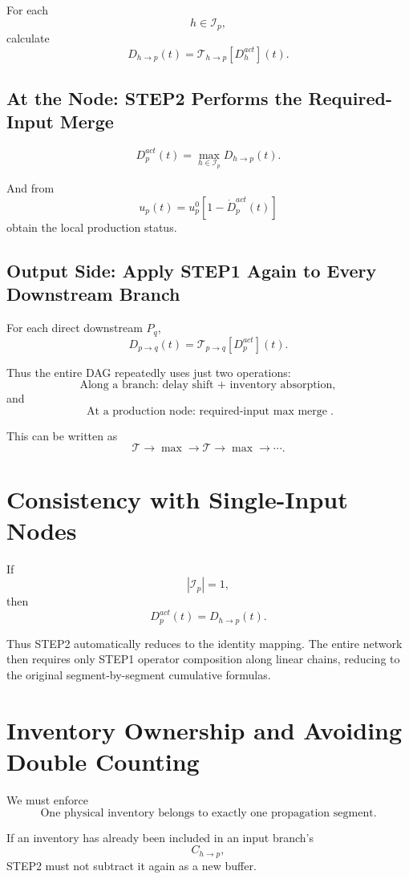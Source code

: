 \documentclass[11pt]{article}
\begin{document}
For each
\[
h\in\mathcal I_p,
\]
calculate
\[
\boxed{
D_{h\to p}(t)
=
\mathcal T_{h\to p}[D_h^{act}](t).
}
\tag{29}
\]

\subsection*{At the Node: STEP2 Performs the Required-Input Merge}

\[
\boxed{
D_p^{act}(t)
=
\max_{h\in\mathcal I_p}
D_{h\to p}(t).
}
\tag{30}
\]

And from
\[
\boxed{
u_p(t)
=
u_p^0
[1-\dot D_p^{act}(t)]
}
\tag{31}
\]
obtain the local production status.

\subsection*{Output Side: Apply STEP1 Again to Every Downstream Branch}

For each direct downstream \(P_q\),
\[
\boxed{
D_{p\to q}(t)
=
\mathcal T_{p\to q}[D_p^{act}](t).
}
\tag{32}
\]

Thus the entire DAG repeatedly uses just two operations:
\[
\boxed{
\text{Along a branch: delay shift + inventory absorption},
}
\]
and
\[
\boxed{
\text{At a production node: required-input \(\max\) merge}.
}
\]

This can be written as
\[
\boxed{
\mathcal T
\rightarrow
\max
\rightarrow
\mathcal T
\rightarrow
\max
\rightarrow\cdots.
}
\tag{33}
\]

\section{Consistency with Single-Input Nodes}

If
\[
|\mathcal I_p|=1,
\]
then
\[
\boxed{
D_p^{act}(t)
=
D_{h\to p}(t).
}
\tag{34}
\]

Thus STEP2 automatically reduces to the identity mapping.
The entire network then requires only STEP1 operator composition along linear chains,
reducing to the original segment-by-segment cumulative formulas.

\section{Inventory Ownership and Avoiding Double Counting}

We must enforce
\[
\boxed{
\text{One physical inventory belongs to exactly one propagation segment}.
}
\]

If an inventory has already been included in an input branch's
\[
C_{h\to p},
\]
STEP2 must not subtract it again as a new buffer.
\end{document}
